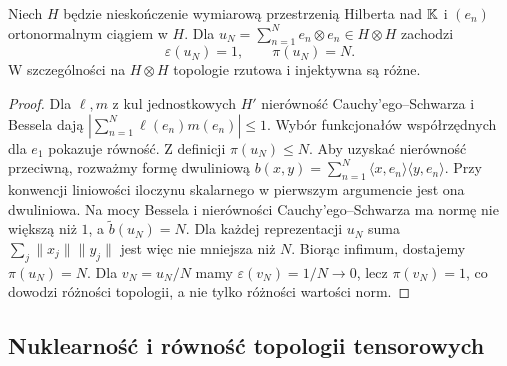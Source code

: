 \begin{twierdzenie}
\label{thm:hilbert-norms24}
Niech $H$ będzie nieskończenie wymiarową przestrzenią Hilberta
nad $\mathbb K$ i $(e_n)$ ortonormalnym ciągiem w $H$. Dla
$u_N=\sum_{n=1}^N e_n\otimes e_n\in H\otimes H$ zachodzi
\[ \varepsilon(u_N)=1,\qquad \pi(u_N)=N. \]
W szczególności na $H\otimes H$ topologie rzutowa i
injektywna są różne.
\end{twierdzenie}
\begin{proof}
Dla $\ell,m$ z kul jednostkowych $H'$ nierówność
Cauchy'ego--Schwarza i Bessela dają
$|\sum_{n=1}^N\ell(e_n)m(e_n)|\le1$. Wybór funkcjonałów
współrzędnych dla $e_1$ pokazuje równość. Z definicji
$\pi(u_N)\le N$. Aby uzyskać nierówność przeciwną,
rozważmy formę dwuliniową
$b(x,y)=\sum_{n=1}^N\langle x,e_n\rangle\langle y,e_n\rangle$.
Przy konwencji liniowości iloczynu skalarnego w pierwszym
argumencie jest ona dwuliniowa. Na mocy Bessela i
nierówności Cauchy'ego--Schwarza ma normę nie większą niż $1$,
a $\widetilde b(u_N)=N$. Dla każdej reprezentacji $u_N$ suma
$\sum_j\|x_j\|\|y_j\|$ jest więc nie mniejsza niż $N$.
Biorąc infimum, dostajemy $\pi(u_N)=N$.
Dla $v_N=u_N/N$ mamy $\varepsilon(v_N)=1/N\to0$,
lecz $\pi(v_N)=1$, co dowodzi różności topologii,
a nie tylko różności wartości norm.
\end{proof}

\subsection{Nuklearność i równość topologii tensorowych}

